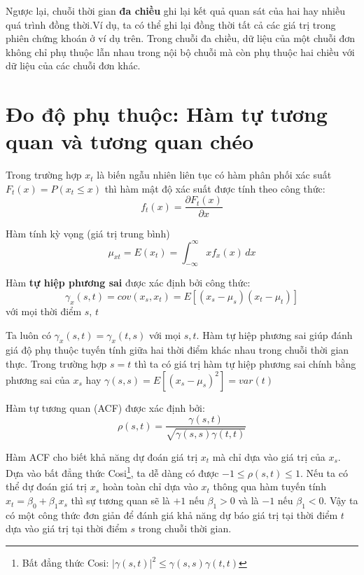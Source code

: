 Ngược lại, chuỗi thời gian \textbf{đa chiều} ghi lại kết quả quan sát của hai hay nhiều quá trình đồng thời.Ví dụ, ta có thể ghi lại đồng thời tất cả các giá trị trong phiên chứng khoán ở ví dụ trên. Trong chuỗi đa chiều, dữ liệu của một chuỗi đơn không chỉ phụ thuộc lẫn nhau trong nội bộ chuỗi mà còn phụ thuộc hai chiều với dữ liệu của các chuỗi đơn khác. 

\section{Đo độ phụ thuộc: Hàm tự tương quan và tương quan chéo}
Trong trường hợp $x_t$ là biến ngẫu nhiên liên tục có hàm phân phối xác suất $F_t(x)=P(x_t\leq x)$ thì hàm mật độ xác suất được tính theo công thức:
	\begin{equation}
		f_t(x)  = \frac{\partial F_t(x)}{\partial x}
	\end{equation}
	\begin{defi} Hàm tính kỳ vọng (giá trị trung bình)
		\begin{equation}
			\mu_{xt} = E(x_t) = \int_{-\infty}^\infty \! xf_x(x) \, dx
		\end{equation}
	\end{defi}
	
	\begin{defi}
		Hàm \textbf{tự hiệp phương sai} được xác định bởi công thức:
		\begin{equation}
			\gamma_x(s,t) = cov(x_s,x_t) = E[(x_s-\mu_s)(x_t-\mu_t)]
		\end{equation}	
		với mọi thời điểm $s$, $t$
	\end{defi}
	Ta luôn có $\gamma_x(s,t) = \gamma_x(t,s)$ với mọi $s,t$. Hàm tự hiệp phương sai giúp đánh giá độ phụ thuộc tuyến tính giữa hai thời điểm khác nhau trong chuỗi thời gian thực. Trong trường hợp $s=t$ thì ta có giá trị hàm tự hiệp phương sai chính bằng phương sai của $x_s$ hay $\gamma(s,s) = E[(x_s-\mu_s)^2] = var(t)$ 

\begin{defi}
	Hàm tự tương quan (ACF)\citep{tsa3} được xác định bởi:
	\begin{equation}
		\rho(s,t) = \frac{\gamma(s,t)}{\sqrt{\gamma(s,s)\gamma(t,t)}}
	\end{equation}
\end{defi}
Hàm ACF cho biết khả năng dự đoán giá trị $x_t$ mà chỉ dựa vào giá trị của $x_s$. Dựa vào bất đẳng thức Cosi\footnote{Bất đẳng thức Cosi: $|\gamma(s,t)|^{2} \leq \gamma(s,s)\gamma(t,t)$}, ta dễ dàng có được $-1\leq \rho(s,t)\leq 1$. Nếu ta có thể dự đoán giá trị $x_{s}$ hoàn toàn chỉ dựa vào $x_t$ thông qua hàm tuyến tính $x_t = \beta_0 + \beta_1x_s$ thì sự tương quan sẽ là $+1$ nếu $\beta_1 > 0$ và là $-1$ nếu $\beta_1<0$. Vậy ta có một công thức đơn giản để đánh giá khả năng dự báo giá trị tại thời điểm $t$ dựa vào giá trị tại thời điểm $s$ trong chuỗi thời gian.

